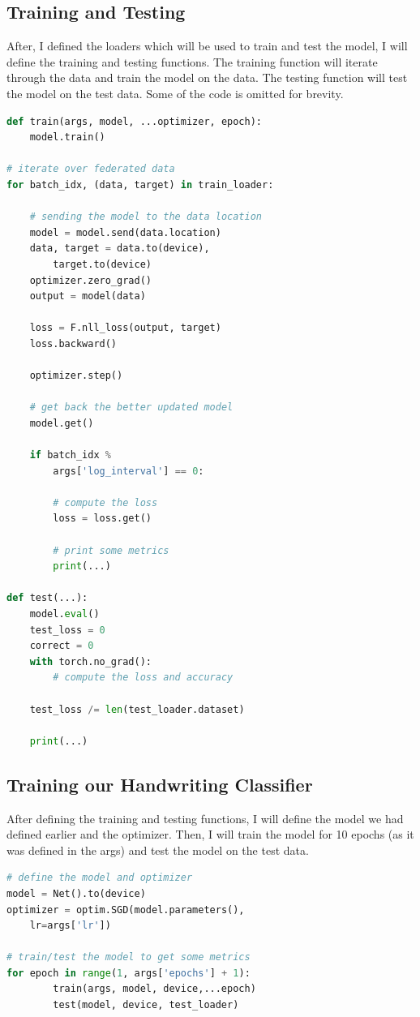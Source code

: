 \documentclass[conference]{IEEEtran}
\begin{document}
\subsection{Training and Testing}

After, I defined the loaders which will be used to train and test the model, I
will define the training and testing functions. The training function will
iterate through the data and train the model on the data. The testing function
will test the model on the test data. Some of the code is omitted for brevity.

\begin{lstlisting}[language=Python]
def train(args, model, ...optimizer, epoch):
    model.train()

# iterate over federated data
for batch_idx, (data, target) in train_loader:

    # sending the model to the data location
    model = model.send(data.location)
    data, target = data.to(device), 
        target.to(device)
    optimizer.zero_grad()
    output = model(data)

    loss = F.nll_loss(output, target)
    loss.backward()

    optimizer.step()

    # get back the better updated model
    model.get()

    if batch_idx % 
        args['log_interval'] == 0:

        # compute the loss
        loss = loss.get()

        # print some metrics
        print(...)

def test(...):
    model.eval()
    test_loss = 0
    correct = 0
    with torch.no_grad():
        # compute the loss and accuracy

    test_loss /= len(test_loader.dataset)

    print(...)
\end{lstlisting}

\subsection{Training our Handwriting Classifier}

After defining the training and testing functions, I will define the model we
had defined earlier and the optimizer. Then, I will train the model for 10
epochs (as it was defined in the args) and test the model on the test data.

\begin{lstlisting}[language=Python]
# define the model and optimizer
model = Net().to(device)
optimizer = optim.SGD(model.parameters(), 
    lr=args['lr'])

# train/test the model to get some metrics
for epoch in range(1, args['epochs'] + 1):
        train(args, model, device,...epoch)
        test(model, device, test_loader)
\end{lstlisting}
\end{document}
